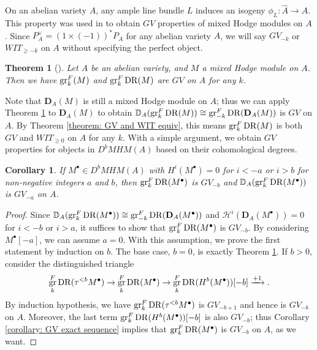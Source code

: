\documentclass[11pt]{amsart}
\newtheorem{theorem}[equation]{Theorem}
\newtheorem{corollary}[equation]{Corollary}
\theoremstyle{definition}
\theoremstyle{plain}
\renewcommand{\H}{\mathcal H}
\newcommand{\bD}{\mathbf D}
\newcommand{\DD}{\mathbb D}
\newcommand{\xto}{\xrightarrow} %
\DeclareMathOperator{\DR}{DR}
\DeclareMathOperator{\gr}{{\rm gr}}
\begin{document}
On an abelian variety $A$, any ample line bundle $L$ induces an isogeny $\phi_L: \hat A \to A$. This property was used in \cite{PS_generic_vanishing} to obtain $GV$ properties of mixed Hodge modules on $A$. Since $P_A^\vee = (1\times(-1))^*P_A$ for any abelian variety $A$, we will say $GV_{-k}$ or $WIT_{\ge -k}$ on $A$ without specifying the perfect object. 

\begin{theorem}[{\cite[Corollary 9.3]{PS_generic_vanishing}}] \label{theorem: GV for MHM}
    Let $A$ be an abelian variety, and $M$ a mixed Hodge module on $A$. Then we have $\gr^F_k(M)$ and $\gr^F_k \DR(M)$ are $GV$ on $A$ for any $k$. 
\end{theorem}

Note that $\bD_A(M)$ is still a mixed Hodge module on $A$; thus we can apply Theorem \ref{theorem: GV for MHM} to $\bD_A(M)$ to obtain $\DD_A(\gr^F_{k} \DR(M)) \cong \gr^F_{-k} \DR(\bD_A(M))$ is $GV$ on $A$. By Theorem \ref{theorem: GV and WIT equiv}, this means $\gr^F_k \DR(M)$ is both $GV$ and $WIT_{\ge 0}$ on $A$ for any $k$. 
With a simple argument, we obtain $GV$ properties for objects in $D^bMHM(A)$ based on their cohomological degrees.

\begin{corollary} \label{corollary: GV for D^bMHM}
    If $M^\bullet \in D^bMHM(A)$ with $H^i(M^\bullet) = 0$ for $i<-a$ or $i>b$ for non-negative integers $a$ and $b$, then $\gr^F_{k} \DR(M^\bullet)$ is $GV_{-b}$ and $\DD_A(\gr^F_k \DR(M^\bullet))$ is $GV_{-a}$ on $A$.  
\end{corollary}

\begin{proof}
    Since $\DD_A(\gr^F_k \DR(M^\bullet)) \cong \gr^F_{-k} \DR(\bD_A(M^\bullet))$ and $\H^i(\bD_A(M^\bullet)) = 0$ for $i<-b$ or $i>a$, it suffices to show that $\gr^F_k \DR(M^\bullet)$ is $GV_{-b}$. By considering $M^\bullet[-a]$, we can assume $a=0$. With this assumption, we prove the first statement by induction on $b$. The base case, $b=0$, is exactly Theorem \ref{theorem: GV for MHM}. If $b>0$, consider the distinguished triangle
    \[\gr^F_{k} \DR(\tau^{<b}M^\bullet) \to \gr^F_{k} \DR(M^\bullet) \to \gr^F_{k} \DR(H^b(M^\bullet))[-b] \xto{+1}.\]
    By induction hypothesis, we have $\gr^F_{k} \DR(\tau^{<b} M^\bullet)$ is $GV_{-b+1}$ and hence is $GV_{-b}$ on $A$. Moreover, the last term $\gr^F_{k} \DR(H^b(M^\bullet))[-b]$ is also $GV_{-b}$; thus Corollary \ref{corollary: GV exact sequence} implies that $\gr^F_{k} \DR(M^\bullet)$ is $GV_{-b}$ on $A$, as we want.
\end{proof}
\end{document}
